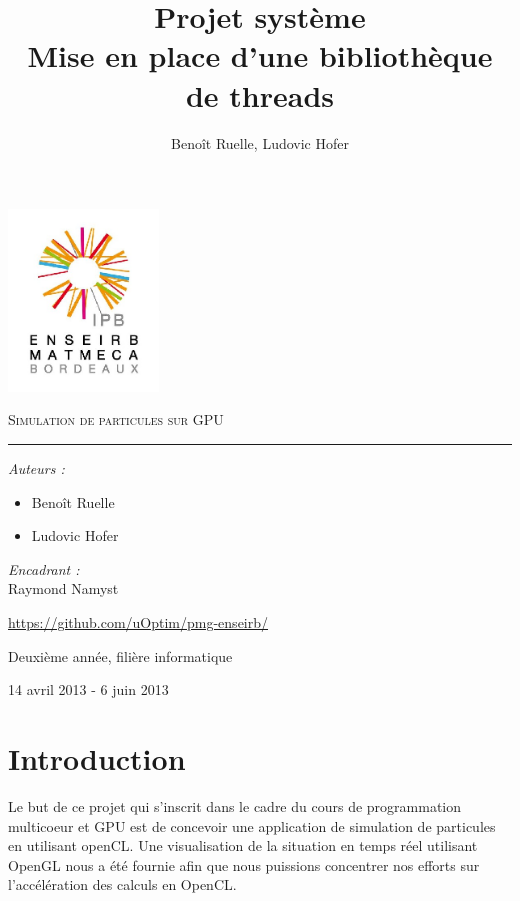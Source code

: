 \documentclass{article}
\title{Projet système \\ Mise en place d'une bibliothèque de threads}
\author{Benoît Ruelle, Ludovic Hofer}
\begin{document}
\begin{center}
  \includegraphics [width=40mm]{ENSEIRB-MATMECA.jpg} 


\textsc{\Huge Simulation de particules sur GPU}\\[0.5cm]
\rule{0.4\textwidth}{1pt}


\begin{center}
  
  \begin{flushleft}
    \large
    \emph{Auteurs :}\\
    \begin{itemize}
    \item Benoît Ruelle
    \item Ludovic Hofer
    \end{itemize}
  \end{flushleft}
  
  
  \begin{flushright}
    \large
    \emph{Encadrant :}\\
    Raymond Namyst
  \end{flushright}
\end{center}


{\large \url{https://github.com/uOptim/pmg-enseirb/}}


{\large Deuxième année, filière informatique} 
~

{\large 14 avril 2013 - 6 juin 2013}\\

\end{center}
\thispagestyle{empty}
\pagebreak
\tableofcontents
\listoffigures
\newpage

\section{Introduction}
Le but de ce projet qui s'inscrit dans le cadre du cours de programmation
multicoeur et GPU est de concevoir une application de simulation de
particules en utilisant openCL. Une visualisation de la situation en temps
réel utilisant OpenGL nous a été fournie afin que nous puissions concentrer
nos efforts sur l'accélération des calculs en OpenCL.
\end{document}
